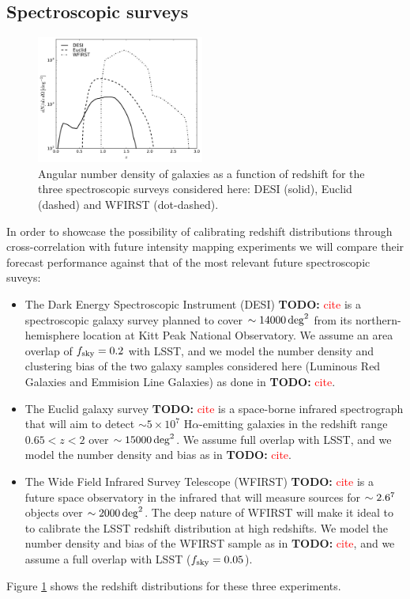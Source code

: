 \documentclass[prd,twocolumn]{revtex4}
\newcommand{\TODO}[1]{{\bf TODO:} \textcolor{red}{#1}}
\begin{document}
  \subsection{Spectroscopic surveys}\label{ssec:method.spec}
    \begin{figure}
      \centering
      \includegraphics[width=0.49\textwidth]{nz_spec}
      \caption{Angular number density of galaxies as a function of redshift for the three
               spectroscopic surveys considered here: DESI (solid), Euclid (dashed) and
               WFIRST (dot-dashed).}
      \label{fig:nz_spec}
    \end{figure}
    In order to showcase the possibility of calibrating redshift distributions through
    cross-correlation with future intensity mapping experiments we will compare their
    forecast performance against that of the most relevant future spectroscopic suveys:
    \begin{itemize}
      \item The Dark Energy Spectroscopic Instrument (DESI) \TODO{cite} is a spectroscopic galaxy
            survey planned to cover $\sim14000\,{\rm deg}^2$ from its northern-hemisphere
            location at Kitt Peak National Observatory. We assume an area overlap of
            $f_{\rm sky}=0.2$ with LSST, and we model the number density and clustering bias
            of the two galaxy samples considered here (Luminous Red Galaxies and Emmision Line
            Galaxies) as done in \TODO{cite}.
      \item The Euclid galaxy survey \TODO{cite} is a space-borne infrared spectrograph that
            will aim to detect $\sim5\times10^7$ H$\alpha$-emitting galaxies in the redshift
            range $0.65<z<2$ over $\sim15000\,{\rm deg}^2$. We assume full overlap with LSST,
            and we model the number density and bias as in \TODO{cite}.
      \item The Wide Field Infrared Survey Telescope (WFIRST) \TODO{cite} is a future space
            observatory in the infrared that will measure sources for $\sim2.6\time10^7$ objects
            over $\sim2000\,{\rm deg}^2$. The deep nature of WFIRST will make it ideal to
            to calibrate the LSST redshift distribution at high redshifts. We model the number
            density and bias of the WFIRST sample as in \TODO{cite}, and we assume a full
            overlap with LSST ($f_{\rm sky}=0.05$).
    \end{itemize}
    Figure \ref{fig:nz_spec} shows the redshift distributions for these three experiments.
 
\end{document}
